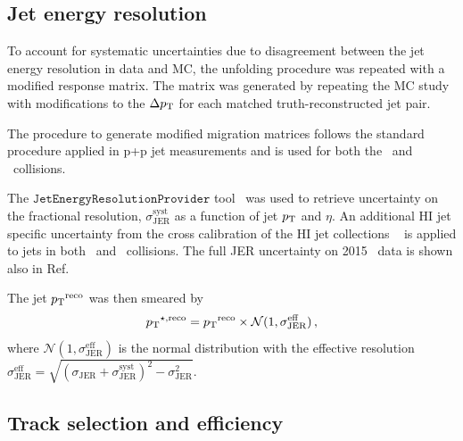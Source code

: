 \subsection{Jet energy resolution}
To account for systematic uncertainties due to disagreement between the jet energy resolution in data and MC, the unfolding procedure was repeated with a modified response matrix.
The matrix was generated by repeating the MC study with modifications to the $\Delta \mbox{$p_{\mathrm{T}}$}$ for each matched truth-reconstructed jet pair.




     The procedure to generate modified migration matrices follows the standard procedure applied in p+p jet measurements 
     and is used for both the \pp\ and \pbpb\ collisions.

     The $\texttt{JetEnergyResolutionProvider}$ tool~\cite{JERUncertaintyProviderRun2} was used to 
     retrieve uncertainty on the fractional resolution, $\sigma^{\mathrm{syst}}_{\mathrm{JER}}$ as a function of jet $\mbox{$p_{\mathrm{T}}$}$ and $\eta$.
An additional HI jet specific uncertainty from the cross calibration of the HI jet collections ~\cite{cc2015} is applied to jets in both \pp\ and \pbpb\ collisions.
     The full JER uncertainty on 2015 \pp\ data is shown also in Ref.~\cite{Aad:1696485}

     The jet $\mbox{$p_{\mathrm{T}}$}^{\mathrm{reco}}$ was then smeared by
     \begin{equation}
	\mbox{$p_{\mathrm{T}}$}^{\star, \mathrm{reco}} = \mbox{$p_{\mathrm{T}}$}^{\mathrm{reco}}\times \mathcal{N}(1,\sigma^{\mathrm{eff}}_{\mathrm{JER}})\,,
     \end{equation}
     where $\mathcal{N}(1,\sigma^{\mathrm{eff}}_{\mathrm{JER}})$ is the normal distribution with the effective resolution $\sigma^{\mathrm{eff}}_{\mathrm{JER}}=\sqrt{(\sigma_{\mathrm{JER}} + \sigma^{\mathrm{syst}}_{\mathrm{JER}})^{2} - \sigma_{\mathrm{JER}}^{2}}$.




\subsection{Track selection and efficiency}

